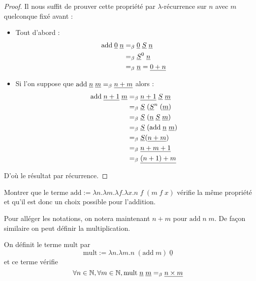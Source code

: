 \begin{proof}
    Il nous suffit de prouver cette propriété par $\lambda$-récurrence sur $n$ avec $m$ quelconque fixé avant :
    \begin{itemize}[label=$\bullet$]
        \item Tout d'abord : 
        \begin{align*}
            \mathrm{add}\;\underline 0\;\underline n &=_\beta \underline 0\;\underline S\;\underline n\\
            &=_\beta \underline S^0\;\underline n\\
            &=_\beta \underline n = \underline{0+n}
        \end{align*}
        \item Si l'on suppose que $\mathrm{add}\;\underline n\;\underline m =_\beta \underline{n+m}$ alors :
        \begin{align*}
            \mathrm{add}\;\underline {n+1}\;\underline m &=_\beta \underline{n+1} \;\underline S\;\underline m\\
            &=_\beta \underline S\;(\underline S^n\;(\underline m)\\
            &=_\beta \underline S\;(\underline n\;\underline S\;\underline m)\\
            &=_\beta \underline S\;(\mathrm{add}\;\underline n\;\underline m)\\
            &=_\beta \underline S(\underline{n+m})\\
            &=_\beta \underline{n+m+1}\\
            &=_\beta \underline{(n+1)+m}
        \end{align*}
    \end{itemize}

    D'où le résultat par récurrence.
\end{proof}

\begin{exo}
    Montrer que le terme $\mathrm{add} := \lambda n.\lambda m. \lambda f.\lambda x. n\;f\;(m\;f\;x)$ vérifie la même propriété et qu'il est donc un choix possible pour l'addition.
\end{exo}

Pour alléger les notations, on notera maintenant $n+m$ pour $\mathrm{add}\;n\;m$. De façon similaire on peut définir la multiplication.

\begin{defi}[Multiplication]
    On définit le terme $\mathrm{mult}$ par $$\mathrm{mult} := \lambda n.\lambda m. n\;(\mathrm{add}\;m)\;\underline 0$$ et ce terme vérifie $$\forall n\in\mathbb{N},\forall m\in\mathbb{N}, \mathrm{mult}\;\underline n\;\underline m =_\beta \underline{n\times m}$$
\end{defi}

